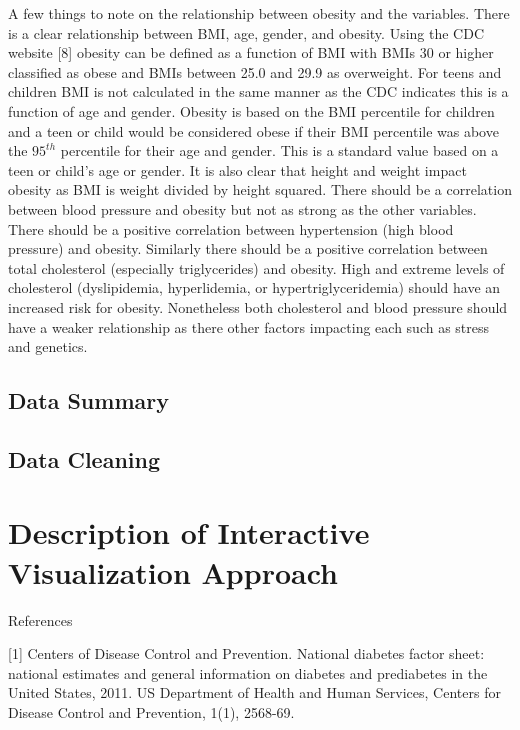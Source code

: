 \documentclass[12pt]{article}
\numberwithin{figure}{section}
\begin{document}
A few things to note on the relationship between obesity and the variables.  There is a clear relationship between BMI, age, gender, and obesity.  Using the CDC website [8] obesity can be defined as a function of BMI with BMIs 30 or higher classified as obese and BMIs between 25.0 and 29.9 as overweight.  For teens and children BMI is not calculated in the same manner as the CDC indicates this is a function of age and gender.  Obesity is based on the BMI percentile for children and a teen or child would be considered obese if their BMI percentile was above the $95^{th}$ percentile for their age and gender.  This is a standard value based on a teen or child's age or gender.  It is also clear that height and weight impact obesity as BMI is weight divided by height squared.  There should be a correlation between blood pressure and obesity but not as strong as the other variables.  There should be a positive correlation between hypertension (high blood pressure) and obesity.  Similarly there should be a positive correlation between total cholesterol (especially triglycerides) and obesity.  High and extreme levels of cholesterol (dyslipidemia, hyperlidemia, or hypertriglyceridemia) should have an increased risk for obesity.  Nonetheless both cholesterol and blood pressure should have a weaker relationship as there other factors impacting each such as stress and genetics.


{\subsection {Data Summary}}

{\subsection {Data Cleaning}}


\newpage


{\section{Description of Interactive Visualization Approach}}

\newpage

{\sf References}

[1] Centers of Disease Control and Prevention. National diabetes factor sheet: national estimates and general information on diabetes and prediabetes in the United States, 2011. US Department of Health and Human Services, Centers for Disease Control and Prevention, 1(1), 2568-69.
\end{document}
